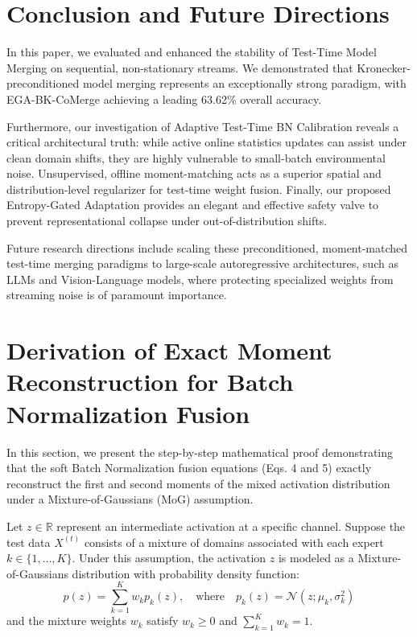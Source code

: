 \documentclass{article}
\theoremstyle{plain}
\theoremstyle{definition}
\theoremstyle{remark}
\begin{document}
\section{Conclusion and Future Directions}
\label{sec:conclusion}
In this paper, we evaluated and enhanced the stability of Test-Time Model Merging on sequential, non-stationary streams. We demonstrated that Kronecker-preconditioned model merging represents an exceptionally strong paradigm, with EGA-BK-CoMerge achieving a leading 63.62\% overall accuracy. 

Furthermore, our investigation of Adaptive Test-Time BN Calibration reveals a critical architectural truth: while active online statistics updates can assist under clean domain shifts, they are highly vulnerable to small-batch environmental noise. Unsupervised, offline moment-matching acts as a superior spatial and distribution-level regularizer for test-time weight fusion. Finally, our proposed Entropy-Gated Adaptation provides an elegant and effective safety valve to prevent representational collapse under out-of-distribution shifts.

Future research directions include scaling these preconditioned, moment-matched test-time merging paradigms to large-scale autoregressive architectures, such as LLMs and Vision-Language models, where protecting specialized weights from streaming noise is of paramount importance.

\newpage



\newpage
\appendix
\onecolumn

\section{Derivation of Exact Moment Reconstruction for Batch Normalization Fusion}
In this section, we present the step-by-step mathematical proof demonstrating that the soft Batch Normalization fusion equations (Eqs. 4 and 5) exactly reconstruct the first and second moments of the mixed activation distribution under a Mixture-of-Gaussians (MoG) assumption.

Let $z \in \mathbb{R}$ represent an intermediate activation at a specific channel. Suppose the test data $X^{(t)}$ consists of a mixture of domains associated with each expert $k \in \{1, \dots, K\}$. Under this assumption, the activation $z$ is modeled as a Mixture-of-Gaussians distribution with probability density function:
\begin{equation}
    p(z) = \sum_{k=1}^K w_k p_k(z), \quad \text{where} \quad p_k(z) = \mathcal{N}(z; \mu_k, \sigma^2_k)
\end{equation}
and the mixture weights $w_k$ satisfy $w_k \ge 0$ and $\sum_{k=1}^K w_k = 1$.
\end{document}

